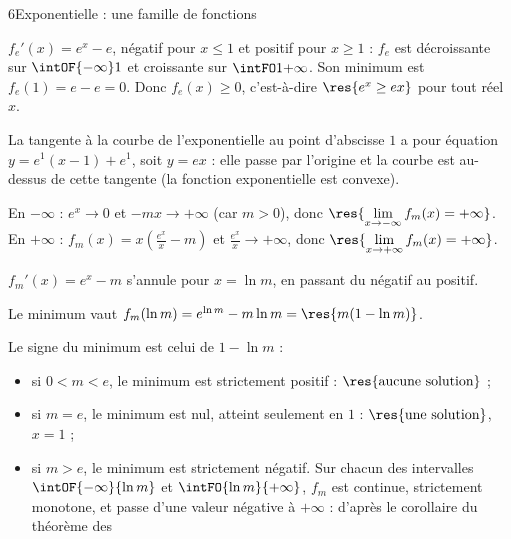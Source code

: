 \begin{corrigeBac}{6}{Exponentielle : une famille de fonctions}
\begin{questions}
  \item $f_e'(x)=e^{x}-e$, négatif pour $x\leq1$ et positif pour $x\geq1$ : $f_e$ est décroissante sur $\intOF{-\infty}1$ et croissante
    sur $\intFO1{+\infty}$. Son minimum est $f_e(1)=e-e=0$. Donc $f_e(x)\geq0$, c'est-à-dire $\res{e^{x}\geq ex}$ pour tout réel $x$. \pts{1 pt}
  \item La tangente à la courbe de l'exponentielle au point d'abscisse $1$ a pour équation $y=e^{1}(x-1)+e^{1}$, soit $y=ex$ : elle passe
    par l'origine et la courbe est au-dessus de cette tangente (la fonction exponentielle est convexe). 
\end{questions}
\begin{questions}[resume]
  \item En $-\infty$ : $e^{x}\to0$ et $-mx\to+\infty$ (car $m>0$), donc $\res{\lim\limits_{x\to-\infty}f_m(x)=+\infty}$. En $+\infty$ :
    $f_m(x)=x\left(\frac{e^{x}}{x}-m\right)$ et $\frac{e^{x}}{x}\to+\infty$, donc $\res{\lim\limits_{x\to+\infty}f_m(x)=+\infty}$. \pts{1 pt}
  \item $f_m'(x)=e^{x}-m$ s'annule pour $x=\ln m$, en passant du négatif au positif.
\begin{center}
\begin{tableau}
\end{tableau}
\end{center}
    Le minimum vaut $f_m(\ln m)=e^{\ln m}-m\ln m=\res{m(1-\ln m)}$. 
  \item Le signe du minimum est celui de $1-\ln m$ :
    \begin{itemize}[leftmargin=1.2em,itemsep=0.3mm,topsep=0.5mm]
      \item si $0<m<e$, le minimum est strictement positif : $\res{\text{aucune solution}}$ ;
      \item si $m=e$, le minimum est nul, atteint seulement en $1$ : $\res{\text{une solution}}$, $x=1$ ;
      \item si $m>e$, le minimum est strictement négatif. Sur chacun des intervalles $\intOF{-\infty}{\ln m}$ et $\intFO{\ln m}{+\infty}$,
        $f_m$ est continue, strictement monotone, et passe d'une valeur négative à $+\infty$ : d'après le corollaire du théorème des

\end{itemize}
\end{questions}
\end{corrigeBac}
